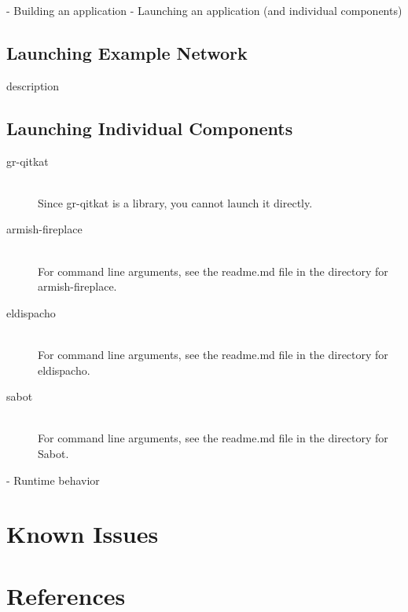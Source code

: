 \documentclass[letterpaper,twoside=false]{scrbook}
\begin{document}
 - Building an application
 - Launching an application (and individual components)
 	\section{Launching Example Network}
 		description

 	\section{Launching Individual Components}
 		\begin{description}
		\item[gr-qitkat] \hfill \\
		Since gr-qitkat is a library, you cannot launch it directly.
		
		\item[armish-fireplace] \hfill \\
		For command line arguments, see the readme.md file in the directory for armish-fireplace.
		
		\item[eldispacho] \hfill \\
		For command line arguments, see the readme.md file in the directory for eldispacho.
		
		\item[sabot] \hfill \\
		For command line arguments, see the readme.md file in the directory for Sabot.
		
		\end{description}
 - Runtime behavior
\chapter{Known Issues}
\chapter{References}
\end{document}
